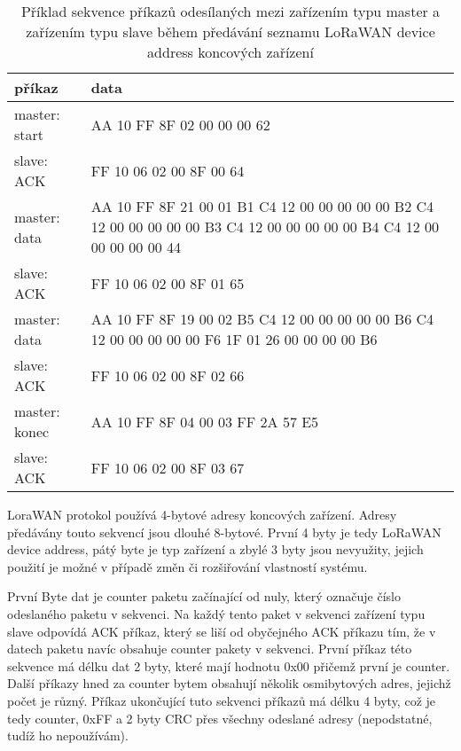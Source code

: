 \begin{table}[!h]
    \begin{tabular}{ |l|p{10cm}| }
    \hline
    příkaz      &  data    \\ \hline \hline
    master: start      &  AA 10 FF 8F 02 00 00 00 62    \\ \hline
    slave: ACK        &  FF 10 06 02 00 8F 00 64    \\ \hline
    master: data     &  AA 10 FF 8F 21 00 01 B1 C4 12 00 00 00 00 00 B2 C4 12 00 00 00 00 00 B3 C4 12 00 00 00 00 00 B4 C4 12 00 00 00 00 00 44 \\ \hline
    slave: ACK      &  FF 10 06 02 00 8F 01 65   \\ \hline
    master: data     &  AA 10 FF 8F 19 00 02 B5 C4 12 00 00 00 00 00 B6 C4 12 00 00 00 00 00 F6 1F 01 26 00 00 00 00 B6 \\ \hline
    slave: ACK      &   FF 10 06 02 00 8F 02 66   \\ \hline
    master: konec   &   AA 10 FF 8F 04 00 03 FF 2A 57 E5   \\ \hline
    slave: ACK      &   FF 10 06 02 00 8F 03 67  \\ \hline
    \end{tabular}
    \caption{Příklad sekvence příkazů odesílaných mezi zařízením typu master a zařízením typu slave během předávání seznamu LoRaWAN device address koncových zařízení}
    \label{table:2}
\end{table}

LoraWAN protokol používá 4-bytové adresy koncových zařízení.
Adresy předávány touto sekvencí jsou dlouhé 8-bytové. První 4 byty je tedy LoRaWAN device address, pátý byte je typ zařízení a zbylé 3 byty jsou nevyužity, jejich použití je možné v případě změn či rozšiřování vlastností systému. 

První Byte dat je counter paketu začínající od nuly, který označuje číslo odeslaného paketu v sekvenci. Na každý tento paket v sekvenci zařízení typu slave odpovídá ACK příkaz, který se liší od obyčejného ACK příkazu tím, že v datech paketu navíc obsahuje counter pakety v sekvenci.
První příkaz této sekvence má délku dat 2 byty, které mají hodnotu 0x00 přičemž první je counter.
Další příkazy hned za counter bytem obsahují několik osmibytových adres, jejichž počet je různý.
Příkaz ukončující tuto sekvenci příkazů má délku 4 byty, což je tedy counter, 0xFF a 2 byty CRC přes všechny odeslané adresy (nepodstatné, tudíž ho nepoužívám).

